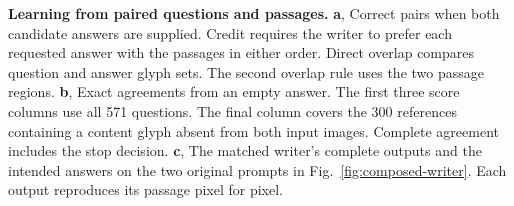 \textbf{Learning from paired questions and passages.}
\textbf{a}, Correct pairs when both candidate answers are supplied. Credit requires the writer to prefer each requested answer with the passages in either order. Direct overlap compares question and answer glyph sets. The second overlap rule uses the two passage regions. \textbf{b}, Exact agreements from an empty answer. The first three score columns use all 571 questions. The final column covers the 300 references containing a content glyph absent from both input images. Complete agreement includes the stop decision. \textbf{c}, The matched writer's complete outputs and the intended answers on the two original prompts in Fig.~\ref{fig:composed-writer}. Each output reproduces its passage pixel for pixel.
